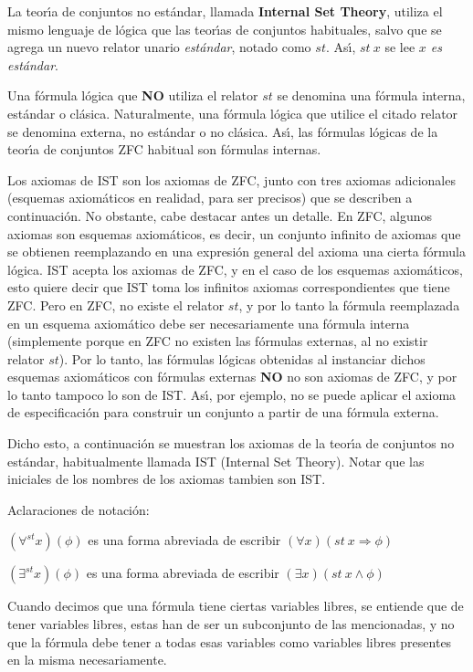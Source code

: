 \documentclass[12pt]{article}
\begin{document}
La teor\'\i a de conjuntos no est\'andar, llamada \textbf{Internal Set Theory}, utiliza el mismo lenguaje de l\'ogica que las teor\'\i as de conjuntos habituales,
salvo que se agrega un nuevo relator unario \textit{est\'andar}, notado como $st$.
As\'\i , $st\ x$ se lee \textit{$x$ es est\'andar}.


Una f\'ormula l\'ogica que \textbf{NO} utiliza el relator $st$ se denomina una f\'ormula interna, est\'andar o cl\'asica.
Naturalmente, una f\'ormula l\'ogica que utilice el citado relator se denomina externa, no est\'andar o no cl\'asica.
As\'\i , las f\'ormulas l\'ogicas de la teor\'\i a de conjuntos ZFC habitual son f\'ormulas internas.


Los axiomas de IST son los axiomas de ZFC, junto con tres axiomas adicionales (esquemas axiom\'aticos en realidad,
para ser precisos) que se describen a continuaci\'on.
No obstante, cabe destacar antes un detalle. En ZFC, algunos axiomas son esquemas axiom\'aticos, es decir,
un conjunto infinito de axiomas que se obtienen reemplazando en una expresi\'on general del axioma una cierta
f\'ormula l\'ogica. IST acepta los axiomas de ZFC, y en el caso de los esquemas axiom\'aticos, esto quiere decir
que IST toma los infinitos axiomas correspondientes que tiene ZFC. Pero en ZFC, no existe el relator $st$, y
por lo tanto la f\'ormula reemplazada en un esquema axiom\'atico debe ser necesariamente una f\'ormula interna
(simplemente porque en ZFC no existen las f\'ormulas externas, al no existir relator $st$). Por lo tanto,
las f\'ormulas l\'ogicas obtenidas al instanciar dichos esquemas axiom\'aticos con f\'ormulas externas \textbf{NO}
no son axiomas de ZFC, y por lo tanto tampoco lo son de IST. As\'\i , por ejemplo, no se puede aplicar el
axioma de especificaci\'on para construir un conjunto a partir de una f\'ormula externa.


Dicho esto, a continuaci\'on se muestran los axiomas de la teor\'\i a de conjuntos no est\'andar, habitualmente llamada IST (Internal Set Theory).
Notar que las iniciales de los nombres de los axiomas tambien son IST.


Aclaraciones de notaci\'on:


$(\forall^{st}x)(\phi)$ es una forma abreviada de escribir $(\forall x)(st \ x \Rightarrow \phi)$


$(\exists^{st}x)(\phi)$ es una forma abreviada de escribir $(\exists x)(st \ x \wedge \phi)$

Cuando decimos que una f\'ormula tiene ciertas variables libres, se entiende que de tener variables libres,
estas han de ser un subconjunto de las mencionadas, y no que la f\'ormula debe tener a todas esas variables
como variables libres presentes en la misma necesariamente.
\end{document}
